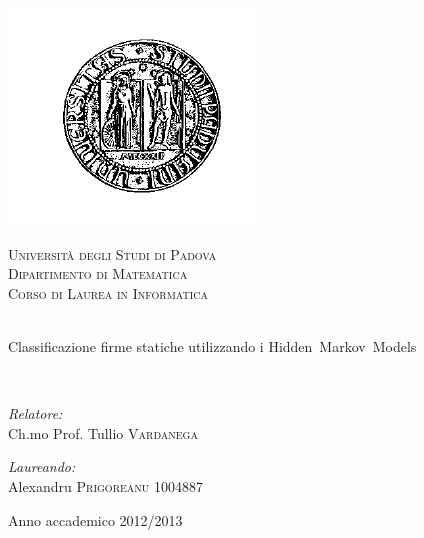 \documentclass[a4paper]{article}
\begin{document}
\begin{titlepage}
 
\begin{center}
 
\includegraphics[scale=.5]{logoBlack.png}
 
\textsc{\LARGE Università degli Studi di Padova}\\[1.5cm]
 
\textsc{\Large Dipartimento di Matematica\\[0.2cm] Corso di Laurea in Informatica}\\[0.8cm]
  
\\[0.8cm]{\Huge \doublespacing \bfseries \begin{spacing}{1}{Classificazione firme statiche utilizzando i Hidden~Markov~Models}\end{spacing}}
\\[2cm]

\begin{minipage}{0.4\textwidth}
\begin{flushleft} \large
\emph{Relatore:} \\
Ch.mo Prof. Tullio \textsc{Vardanega}
\end{flushleft}
\end{minipage}
\begin{minipage}{0.4\textwidth}
\begin{flushright} \large
\emph{Laureando:}\\
Alexandru \textsc{Prigoreanu 1004887}
\end{flushright}
\end{minipage}
 
\vfill
 
{\large Anno accademico 2012/2013}
 
\end{center}
 
\end{titlepage}
\end{document}
